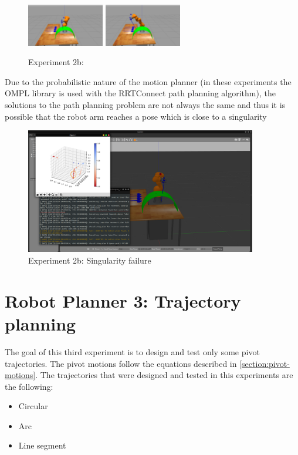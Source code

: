 \begin{center}
\begin{figure}[H]
\includegraphics[width=0.3\textwidth]{images/robot_planner2b/robot_planner2b_8}
\includegraphics[width=0.3\textwidth]{images/robot_planner2b/robot_planner2b_9}\\
\caption{Experiment 2b:}
\end{figure}
\end{center}

Due to the probabilistic nature of the motion planner (in these experiments the OMPL library is used with the RRTConnect path planning algorithm), the solutions 
to the path planning problem are not always the same and thus it is possible that the robot arm reaches a pose which is close to a singularity
\begin{center}
\begin{figure}[H]
\centering
\includegraphics[width=0.9\textwidth]{images/robot_planner2b/singularity_failure.png}
\caption{Experiment 2b: Singularity failure}
\end{figure}
\end{center}

\section{Robot Planner 3: Trajectory planning}

The goal of this third experiment is to design and test only some pivot trajectories. The pivot motions follow the equations described in 
\ref{section:pivot-motions}. The trajectories that were designed and tested in this experiments are the following:
\begin{itemize}
\item Circular
\item Arc
\item Line segment
\end{itemize}

